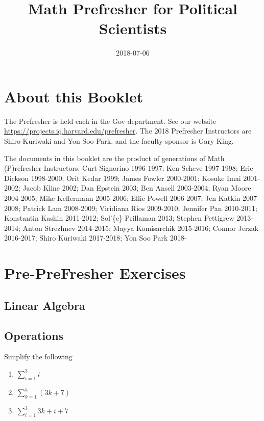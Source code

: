 \documentclass[]{book}
\title{Math Prefresher for Political Scientists}
\author{}
\date{2018-07-06}
\providecommand{\tightlist}{%
  \setlength{\itemsep}{0pt}\setlength{\parskip}{0pt}}
\theoremstyle{definition}
\theoremstyle{definition}
\theoremstyle{definition}
\theoremstyle{remark}
\begin{document}
\maketitle

{
\setcounter{tocdepth}{1}
\tableofcontents
}
\chapter*{About this Booklet}\label{about-this-booklet}

The Prefresher is held each in the Gov department. See our website
\url{https://projects.iq.harvard.edu/prefresher}. The 2018 Prefresher
Instructors are Shiro Kuriwaki and Yon Soo Park, and the faculty sponsor
is Gary King.

The documents in this booklet are the product of generations of Math
(P)refresher Instructors: Curt Signorino 1996-1997; Ken Scheve
1997-1998; Eric Dickson 1998-2000; Orit Kedar 1999; James Fowler
2000-2001; Kosuke Imai 2001-2002; Jacob Kline 2002; Dan Epstein 2003;
Ben Ansell 2003-2004; Ryan Moore 2004-2005; Mike Kellermann 2005-2006;
Ellie Powell 2006-2007; Jen Katkin 2007-2008; Patrick Lam 2008-2009;
Viridiana Rios 2009-2010; Jennifer Pan 2010-2011; Konstantin Kashin
2011-2012; Sol'\{e\} Prillaman 2013; Stephen Pettigrew 2013-2014; Anton
Strezhnev 2014-2015; Mayya Komisarchik 2015-2016; Connor Jerzak
2016-2017; Shiro Kuriwaki 2017-2018; Yon Soo Park 2018-

\chapter{Pre-PreFresher Exercises}\label{pre-prefresher-exercises}

\section{Linear Algebra}\label{linear-algebra}

\section{Operations}\label{operations}

Simplify the following

\begin{enumerate}
\def\labelenumi{\arabic{enumi}.}
\tightlist
\item
  \(\sum^3_{i = 1} i\)
\item
  \(\sum^5_{k = 1}(3k + 7)\)
\item
  \(\sum^3_{i= 1} 3k + i + 7\)
\end{enumerate}
\end{document}
